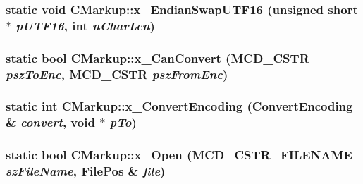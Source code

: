 \subsubsection[x\_\-EndianSwapUTF16]{\setlength{\rightskip}{0pt plus 5cm}static void CMarkup::x\_\-EndianSwapUTF16 (unsigned short $\ast$ {\em pUTF16}, \/  int {\em nCharLen})\hspace{0.3cm}{\tt  [static, protected]}}\label{classCMarkup_7222375779b91c2b4788057596ff89e4}


\subsubsection[x\_\-CanConvert]{\setlength{\rightskip}{0pt plus 5cm}static bool CMarkup::x\_\-CanConvert ({\bf MCD\_\-CSTR} {\em pszToEnc}, \/  {\bf MCD\_\-CSTR} {\em pszFromEnc})\hspace{0.3cm}{\tt  [static, protected]}}\label{classCMarkup_9db481bb33df7a9ef1e705f323e41ba8}


\subsubsection[x\_\-ConvertEncoding]{\setlength{\rightskip}{0pt plus 5cm}static int CMarkup::x\_\-ConvertEncoding ({\bf ConvertEncoding} \& {\em convert}, \/  void $\ast$ {\em pTo})\hspace{0.3cm}{\tt  [static, protected]}}\label{classCMarkup_5910cc7afd5ec31d3ac60e8a7979efa7}


\subsubsection[x\_\-Open]{\setlength{\rightskip}{0pt plus 5cm}static bool CMarkup::x\_\-Open (MCD\_\-CSTR\_\-FILENAME {\em szFileName}, \/  {\bf FilePos} \& {\em file})\hspace{0.3cm}{\tt  [static, protected]}}\label{classCMarkup_93b3532501aec423a2ab6f21c0cd9737}


